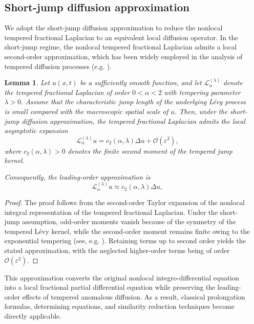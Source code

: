 \documentclass{article}
\newtheorem{lemma}[theorem]{Lemma}
\begin{document}
\subsection{Short-jump diffusion approximation}
We adopt the short-jump diffusion approximation to reduce the nonlocal tempered fractional Laplacian to an equivalent local diffusion operator. In the short-jump regime, the nonlocal tempered fractional Laplacian admits a local second-order approximation, which has been widely employed in the analysis of tempered diffusion processes (e.g. \cite{Baeumer2010,Zhang2018}). 
\begin{lemma}\label{lemma:1} 
Let $u(x,t)$ be a sufficiently smooth function, and let $\mathcal{L}_{\alpha}^{(\lambda)}$ denote the tempered fractional Laplacian of order $0<\alpha<2$ with tempering parameter $\lambda>0$. Assume that the characteristic jump length of the underlying L\'evy process is small compared with the macroscopic spatial scale of $u$. Then, under the short-jump diffusion approximation, the tempered fractional Laplacian admits the local asymptotic expansion
\begin{equation*}
 \mathcal{L}_{\alpha}^{(\lambda)}u = c_{2}(\alpha,\lambda)\Delta u +\mathcal{O}(\varepsilon^{2}), \label{eq:shortjump} \end{equation*}
 where $c_{2}(\alpha,\lambda)>0$ denotes the finite second moment of the tempered jump kernel. 
 \par Consequently, the leading-order approximation is
 \begin{equation*} 
 \mathcal{L}_{\alpha}^{(\lambda)}u \approx c_{2}(\alpha,\lambda)\Delta u , 
 \end{equation*}
 \end{lemma}
\begin{proof}
The proof follows from the second-order Taylor expansion of the nonlocal integral representation of the tempered fractional Laplacian. Under the short-jump assumption, odd-order moments vanish because of the symmetry of the tempered L\'evy kernel, while the second-order moment remains finite owing to the exponential tempering (see, e.g. \cite{Baeumer2010,Sabzikar2015,Zhang2018}). Retaining terms up to second order yields the stated approximation, with the neglected higher-order terms being of order $\mathcal{O}(\varepsilon^2)$. 
\end{proof}
\par 
This approximation converts the original nonlocal integro-differential equation into a local fractional partial differential equation while preserving the leading-order effects of tempered anomalous diffusion. As a result, classical prolongation formulas, determining equations, and similarity reduction techniques become directly applicable.
\end{document}
